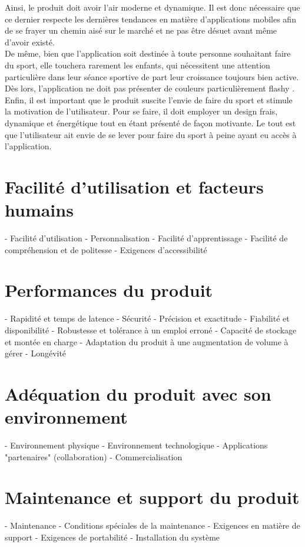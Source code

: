 Ainsi, le produit doit avoir l'air moderne et dynamique. Il est donc nécessaire que ce dernier respecte les dernières tendances en matière d'applications mobiles afin de se frayer un chemin aisé sur le marché et ne pas être désuet avant même d'avoir existé.\\

De même, bien que l'application soit destinée à toute personne souhaitant faire du sport, elle touchera rarement les enfants, qui nécessitent une attention particulière dans leur séance sportive de part leur croissance toujours bien active. Dès lors, l'application ne doit pas présenter de couleurs particulièrement \og flashy \fg{}.\\

Enfin, il est important que le produit suscite l'envie de faire du sport et stimule la motivation de l'utilisateur. Pour se faire, il doit employer un design frais, dynamique et énergétique tout en étant présenté de façon motivante. Le tout est que l'utilisateur ait envie de se lever pour faire du sport à peine ayant eu accès à l'application.

\section{Facilité d'utilisation et facteurs humains}
- Facilité d'utilisation
- Personnalisation
- Facilité d'apprentissage
- Facilité de compréhension et de politesse
- Exigences d'accessibilité

\section{Performances du produit}
- Rapidité et temps de latence
- Sécurité
- Précision et exactitude
- Fiabilité et disponibilité
- Robustesse et tolérance à un emploi erroné
- Capacité de stockage et montée en charge
- Adaptation du produit à une augmentation de volume à gérer
- Longévité

\section{Adéquation du produit avec son environnement}
- Environnement physique
- Environnement technologique
- Applications "partenaires" (collaboration)
- Commercialisation

\section{Maintenance et support du produit}
- Maintenance
- Conditions spéciales de la maintenance
- Exigences en matière de support
- Exigences de portabilité
- Installation du système

